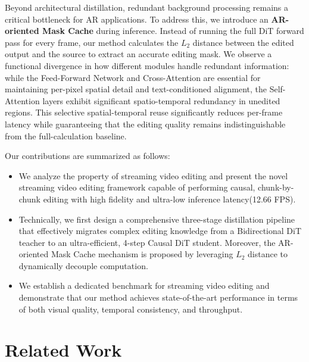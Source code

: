 \documentclass{llmxive}
\begin{document}
Beyond architectural distillation, redundant background processing remains a critical bottleneck for AR applications. To address this, we introduce an \textbf{AR-oriented Mask Cache} during inference. Instead of running the full DiT forward pass for every frame, our method calculates the $L_2$ distance between the edited output and the source to extract an accurate editing mask. We observe a functional divergence in how different modules handle redundant information: while the Feed-Forward Network and Cross-Attention are essential for maintaining per-pixel spatial detail and text-conditioned alignment, the Self-Attention layers exhibit significant spatio-temporal redundancy in unedited regions. This selective spatial-temporal reuse significantly reduces per-frame latency while guaranteeing that the editing quality remains indistinguishable from the full-calculation baseline.


Our contributions are summarized as follows:

\begin{itemize}

\item We analyze the property of streaming video editing and present the novel streaming video editing framework capable of performing causal, chunk-by-chunk editing with high fidelity and ultra-low inference latency(12.66 FPS).



\item Technically, we first design a comprehensive three-stage distillation pipeline that effectively migrates complex editing knowledge from a Bidirectional DiT teacher to an ultra-efficient, 4-step Causal DiT student. Moreover,  the AR-oriented Mask Cache mechanism is proposed by leveraging $L_2$ distance to dynamically decouple computation.


\item We establish a dedicated benchmark for streaming video editing and demonstrate that our method achieves state-of-the-art performance in terms of both visual quality, temporal consistency, and throughput.

\end{itemize}






\section{Related Work}
\label{sec:related_work}
\end{document}
